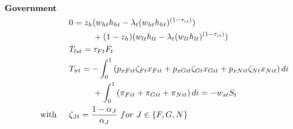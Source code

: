\begin{align}
\text{\textbf{Government}}\ \hspace{4mm}&\nonumber\\
&0=z_h(w_{ht}h_{ht}-\lambda_t(w_{ht}h_{ht})^{(1-\tau_{\iota t})})\nonumber \\ &\hspace{10mm}+(1-z_h)(w_{lt}h_{lt}-\lambda_t(w_{lt}h_{lt})^{(1-\tau_{\iota t})})\nonumber\\
& T_{lst}=\tau_{Ft}F_t\nonumber\\
&T_{\pi t}= -\int_{0}^{1} \left(p_{xFit}\zeta_{Ft}x_{Fit}+p_{xGit}\zeta_{Gt}x_{Git}+ p_{xNit}\zeta_{Nt}x_{Nit}\right)di\nonumber\\ &\hspace{10mm}+\int_{0}^{1}\left(\pi_{Fit}+\pi_{Git}+\pi_{Nit}\right)di = -w_{st}S_t\nonumber\\
\text{with}\ \hspace{4mm}&\zeta_{Jt}=\frac{1-\alpha_J}{\alpha_J}\ for\  J\in\{F,G,N\}\nonumber \\

\end{align}
